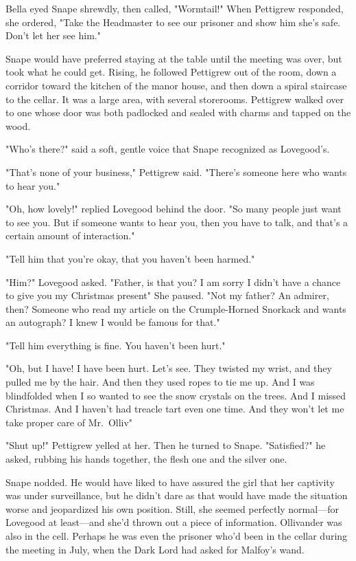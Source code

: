 Bella eyed Snape shrewdly, then called, "Wormtail!" When Pettigrew responded, she ordered, "Take the Headmaster to see our prisoner and show him she's safe. Don't let her see him."

Snape would have preferred staying at the table until the meeting was over, but took what he could get. Rising, he followed Pettigrew out of the room, down a corridor toward the kitchen of the manor house, and then down a spiral staircase to the cellar. It was a large area, with several storerooms. Pettigrew walked over to one whose door was both padlocked and sealed with charms and tapped on the wood.

"Who's there?" said a soft, gentle voice that Snape recognized as Lovegood's.

"That's none of your business," Pettigrew said. "There's someone here who wants to hear you."

"Oh, how lovely!" replied Lovegood behind the door. "So many people just want to see you. But if someone wants to hear you, then you have to talk, and that's a certain amount of interaction."

"Tell him that you're okay, that you haven't been harmed."

"Him?" Lovegood asked. "Father, is that you? I am sorry I didn't have a chance to give you my Christmas present{\el}" She paused. "Not my father? An admirer, then? Someone who read my article on the Crumple-Horned Snorkack and wants an autograph? I knew I would be famous for that."

"Tell him everything is fine. You haven't been hurt."

"Oh, but I have! I have been hurt. Let's see. They twisted my wrist, and they pulled me by the hair. And then they used ropes to tie me up. And I was blindfolded when I so wanted to see the snow crystals on the trees. And I missed Christmas. And I haven't had treacle tart even one time. And they won't let me take proper care of Mr.~Olliv{\el}"

"Shut up!" Pettigrew yelled at her. Then he turned to Snape. "Satisfied?" he asked, rubbing his hands together, the flesh one and the silver one.

Snape nodded. He would have liked to have assured the girl that her captivity was under surveillance, but he didn't dare as that would have made the situation worse and jeopardized his own position. Still, she seemed perfectly normal—for Lovegood at least—and she'd thrown out a piece of information. Ollivander was also in the cell. Perhaps he was even the prisoner who'd been in the cellar during the meeting in July, when the Dark Lord had asked for Malfoy's wand.

